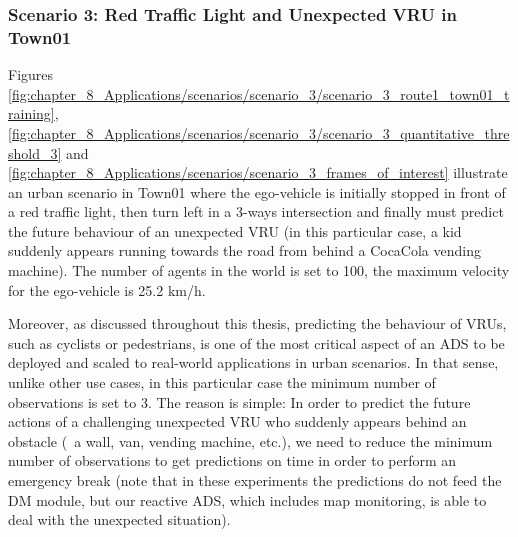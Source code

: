 
\subsubsection{Scenario 3: Red Traffic Light and Unexpected \ac{VRU} in Town01}
\label{subsubsec:8_experimental_results_scenario_3}

Figures \ref{fig:chapter_8_Applications/scenarios/scenario_3/scenario_3_route1_town01_training}, \ref{fig:chapter_8_Applications/scenarios/scenario_3/scenario_3_quantitative_threshold_3} and \ref{fig:chapter_8_Applications/scenarios/scenario_3_frames_of_interest} illustrate an urban scenario in Town01 where the ego-vehicle is initially stopped in front of a red traffic light, then turn left in a 3-ways intersection and finally must predict the future behaviour of an unexpected \ac{VRU} (in this particular case, a kid suddenly appears running towards the road from behind a CocaCola vending machine). The number of agents in the world is set to 100, the maximum velocity for the ego-vehicle is 25.2 km/h.

Moreover, as discussed throughout this thesis, predicting the behaviour of \acp{VRU}, such as cyclists or pedestrians, is one of the most critical aspect of an \ac{ADS} to be deployed and scaled to real-world applications in urban scenarios. In that sense, unlike other use cases, in this particular case the minimum number of observations is set to 3. The reason is simple: In order to predict the future actions of a challenging unexpected \ac{VRU} who suddenly appears behind an obstacle (\eg \ a wall, van, vending machine, etc.), we need to reduce the minimum number of observations to get predictions on time in order to perform an emergency break (note that in these experiments the predictions do not feed the \ac{DM} module, but our reactive \ac{ADS}, which includes map monitoring, is able to deal with the unexpected situation).

